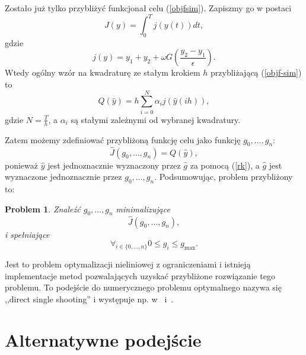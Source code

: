 \documentclass[licencjacka]{pracamgr}
\newtheorem{problem}{Problem}
\begin{document}
Zostało już tylko przybliżyć funkcjonał celu (\ref{objfsim}). Zapiszmy go w postaci
\begin{equation} \label{objf-sim}
  J(y) = \int_0^T j(y(t)) dt,
\end{equation}
gdzie
\begin{equation}
  j(y) = y_1 + y_2 + \omega G\left(\frac{y_2 - y_1}{\epsilon} \right).
\end{equation}
Wtedy ogólny wzór na kwadraturę ze stałym krokiem $h$ przybliżającą (\ref{objf-sim}) to
\begin{equation} \label{quad}
  Q(\hat{y}) = h\sum_{i = 0}^N \alpha_i j(\hat{y}(ih)),
\end{equation}
gdzie $N = \frac{T}{h}$, a $\alpha_i$ są stałymi zależnymi od wybranej kwadratury.

Zatem możemy zdefiniować przybliżoną funkcję celu jako funkcję $g_0,\ldots,g_n$:
\begin{equation}
  \hat{J}(g_0,\ldots, g_n) = Q(\hat{y}),
\end{equation}
ponieważ $\hat{y}$ jest jednoznacznie wyznaczony przez $\hat{g}$ za pomocą (\ref{rk}), a $\hat{g}$ jest wyznaczone jednoznacznie przez $g_0,\ldots,g_n$. Podsumowując, problem przybliżony to:
\begin{problem}\label{problemapprox}
  Znaleźć $g_0,\ldots, g_n$ minimalizujące
\begin{equation}\label{nlp}
  \hat{J}(g_0,\ldots, g_n),
\end{equation}
i spełniające
\begin{equation}\label{nlp_cons}
  \forall_{i \in \{0,\ldots,n\}} 0 \le g_i \le g_{\max}.
\end{equation}
\end{problem}

Jest to problem optymalizacji nieliniowej z ograniczeniami i istnieją implementacje metod pozwalających uzyskać przybliżone rozwiązanie tego problemu. To podejście do numerycznego problemu optymalnego nazywa się ,,direct single shooting'' i występuje np. w~\cite{diehl} i~\cite{rao-methods}.

\section{Alternatywne podejście}
\end{document}
